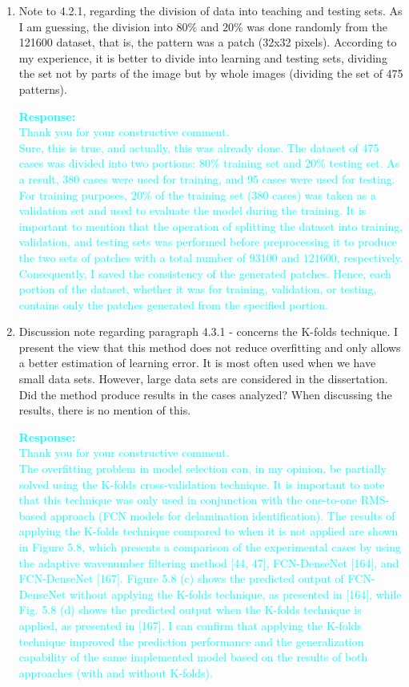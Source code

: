 \documentclass[11pt,a2paper]{report}
\begin{document}
{\begin{enumerate}
		\item Note to 4.2.1, regarding the division of data into teaching and testing sets. 
		As I am guessing, the division into \(80\%\) and \(20\%\) was done randomly from the 121600 dataset, that is, the pattern was a patch (32x32 pixels). 
		According to my experience, it is better to divide into learning and testing sets, dividing the set not by parts of the image but by whole images (dividing the set of 475 patterns).
		
		\textcolor{Cyan}{
			\textbf{Response:} \\
			Thank you for your constructive comment. \\
			Sure, this is true, and actually, this was already done.
			The dataset of 475 cases was divided into two portions: $80\%$ training set and $20\%$ testing set.
			As a result, 380 cases were used for training, and 95 cases were used for testing.
			For training purposes, \(20\%\) of the training set (\(380\) cases) was taken as a validation set and used to evaluate the model during the training.
			It is important to mention that the operation of splitting the dataset into training, validation, and testing sets was performed before preprocessing it to produce the two sets of patches with a total number of \(93100\) and \(121600\), respectively.
			Consequently, I saved the consistency of the generated patches.
			Hence, each portion of the dataset, whether it was for training, validation, or testing, contains only the patches generated from the specified portion.
		}
	
		\item Discussion note regarding paragraph 4.3.1 - concerns the K-folds technique. 
		I present the view that this method does not reduce overfitting and only allows a better estimation of learning error. 
		It is most often used when we have small data sets. 
		However, large data sets are considered in the dissertation. 
		Did the method produce results in the cases analyzed? When discussing the results, there is no mention of this.
		
		\textcolor{Cyan}{
			\textbf{Response:} \\
			Thank you for your constructive comment. \\
			The overfitting problem in model selection can, in my opinion, be partially solved using the K-folds cross-validation technique.
			It is important to note that this technique was only used in conjunction with the one-to-one RMS-based approach (FCN models for delamination identification).
			The results of applying the K-folds technique compared to when it is not applied are shown in Figure 5.8, which presents a comparison of the experimental cases by using the adaptive wavenumber filtering method [44, 47], FCN-DenseNet [164], and FCN-DenseNet [167].
			Figure 5.8 (c) shows the predicted output of FCN-DenseNet without applying the K-folds technique, as presented in [164], while Fig. 5.8 (d) shows the predicted output when the K-folds technique is applied, as presented in [167].
			I can confirm that applying the K-folds technique improved the prediction performance and the generalization capability of the same implemented model based on the results of both approaches (with and without K-folds).
		}
		

\end{enumerate}}
\end{document}

